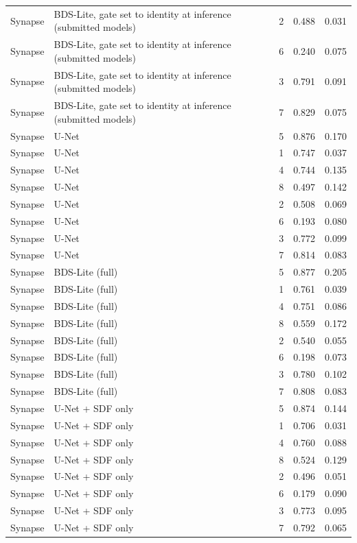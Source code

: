 \begin{tabular}{lllll}
Synapse & BDS-Lite, gate set to identity at inference (submitted models) & 2 & 0.488 & 0.031 \\
Synapse & BDS-Lite, gate set to identity at inference (submitted models) & 6 & 0.240 & 0.075 \\
Synapse & BDS-Lite, gate set to identity at inference (submitted models) & 3 & 0.791 & 0.091 \\
Synapse & BDS-Lite, gate set to identity at inference (submitted models) & 7 & 0.829 & 0.075 \\
Synapse & U-Net & 5 & 0.876 & 0.170 \\
Synapse & U-Net & 1 & 0.747 & 0.037 \\
Synapse & U-Net & 4 & 0.744 & 0.135 \\
Synapse & U-Net & 8 & 0.497 & 0.142 \\
Synapse & U-Net & 2 & 0.508 & 0.069 \\
Synapse & U-Net & 6 & 0.193 & 0.080 \\
Synapse & U-Net & 3 & 0.772 & 0.099 \\
Synapse & U-Net & 7 & 0.814 & 0.083 \\
Synapse & BDS-Lite (full) & 5 & 0.877 & 0.205 \\
Synapse & BDS-Lite (full) & 1 & 0.761 & 0.039 \\
Synapse & BDS-Lite (full) & 4 & 0.751 & 0.086 \\
Synapse & BDS-Lite (full) & 8 & 0.559 & 0.172 \\
Synapse & BDS-Lite (full) & 2 & 0.540 & 0.055 \\
Synapse & BDS-Lite (full) & 6 & 0.198 & 0.073 \\
Synapse & BDS-Lite (full) & 3 & 0.780 & 0.102 \\
Synapse & BDS-Lite (full) & 7 & 0.808 & 0.083 \\
Synapse & U-Net + SDF only & 5 & 0.874 & 0.144 \\
Synapse & U-Net + SDF only & 1 & 0.706 & 0.031 \\
Synapse & U-Net + SDF only & 4 & 0.760 & 0.088 \\
Synapse & U-Net + SDF only & 8 & 0.524 & 0.129 \\
Synapse & U-Net + SDF only & 2 & 0.496 & 0.051 \\
Synapse & U-Net + SDF only & 6 & 0.179 & 0.090 \\
Synapse & U-Net + SDF only & 3 & 0.773 & 0.095 \\
Synapse & U-Net + SDF only & 7 & 0.792 & 0.065 \\

\end{tabular}
